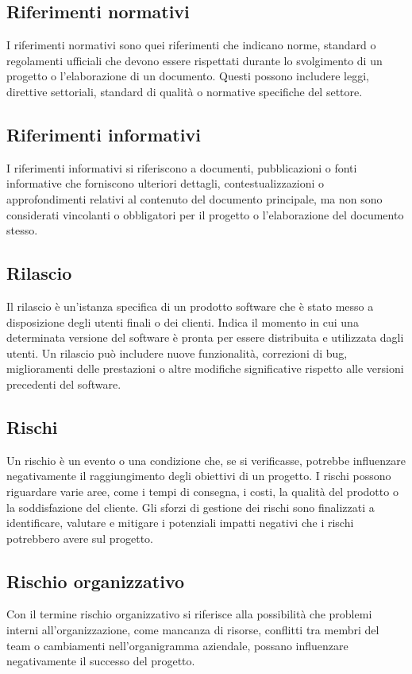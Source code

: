\subsection{Riferimenti normativi} 
I riferimenti normativi sono quei riferimenti che indicano norme, standard o regolamenti ufficiali che devono essere rispettati durante lo svolgimento di un progetto o l'elaborazione di un documento. Questi possono includere leggi, direttive settoriali, standard di qualità o normative specifiche del settore.
\subsection{Riferimenti informativi} 
I riferimenti informativi si riferiscono a documenti, pubblicazioni o fonti informative che forniscono ulteriori dettagli, contestualizzazioni o approfondimenti relativi al contenuto del documento principale, ma non sono considerati vincolanti o obbligatori per il progetto o l'elaborazione del documento stesso.
\subsection{Rilascio} 
Il rilascio è un'istanza specifica di un prodotto software che è stato messo a disposizione degli utenti finali o dei clienti. Indica il momento in cui una determinata versione del software è pronta per essere distribuita e utilizzata dagli utenti. Un rilascio può includere nuove funzionalità, correzioni di bug, miglioramenti delle prestazioni o altre modifiche significative rispetto alle versioni precedenti del software. 
\subsection{Rischi} 
Un rischio è un evento o una condizione che, se si verificasse, potrebbe influenzare negativamente il raggiungimento degli obiettivi di un progetto. I rischi possono riguardare varie aree, come i tempi di consegna, i costi, la qualità del prodotto o la soddisfazione del cliente. Gli sforzi di gestione dei rischi sono finalizzati a identificare, valutare e mitigare i potenziali impatti negativi che i rischi potrebbero avere sul progetto. 
\subsection{Rischio organizzativo} 
Con il termine rischio organizzativo si riferisce alla possibilità che problemi interni all'organizzazione, come mancanza di risorse, conflitti tra membri del team o cambiamenti nell'organigramma aziendale, possano influenzare negativamente il successo del progetto.
